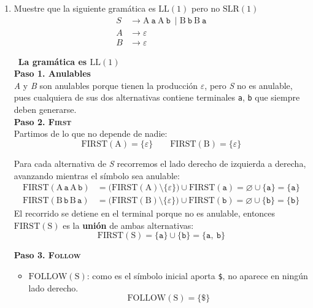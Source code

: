 \documentclass[12pt,letterpaper]{article}
\newcommand{\nt}[1]{\textit{#1}}
\newcommand{\tk}[1]{\texttt{#1}}
\newcommand{\tx}[1]{\text{#1}}
\newcommand{\First}[1]{\mathrm{FIRST}(#1)}
\newcommand{\Follow}[1]{\mathrm{FOLLOW}(#1)}
\renewcommand{\ll}{\mathrm{LL(1)}}
\newcommand{\slr}{\mathrm{SLR(1)}}
\newcommand{\eps}{\varepsilon}
\begin{document}
\thispagestyle{empty}


\newpage

\begin{enumerate}[label=\arabic*.]

\item Muestre que la siguiente gramática es $\ll$ pero no $\slr$
  \[
  \begin{aligned}
    \nt{S} &\to \tx{A}\ \tk{a}\ \tx{A}\ \tk{b}\ \mid \tx{B}\ \tk{b}\ \tx{B}\ \tk{a} \\
    \nt{A} &\to \eps \\
    \nt{B} &\to \eps
  \end{aligned}
  \]

  \bigskip
  
  \ \textbf{\large La gramática es $\ll$}\\

  \textbf{Paso 1. Anulables}\\
  \nt{A} y \nt{B} son anulables porque tienen la producción $\eps$, pero \nt{S} no es anulable, pues
  cualquiera de sus dos alternativas contiene terminales \tk{a}, \tk{b} que siempre deben generarse.\\

  \textbf{Paso 2. \textsc{First}}\\
  Partimos de lo que no depende de nadie:
  \[
  \First{\tx{A}} = \{\eps\} \qquad \First{\tx{B}} = \{\eps\}
  \]

  Para cada alternativa de \nt{S} recorremos el lado derecho de izquierda a derecha, avanzando mientras el
  símbolo sea anulable:
  \[
  \begin{aligned}
    \First{\tx{A}\,\tk{a}\,\tx{A}\,\tk{b}}
    &= \big(\First{\tx{A}}\setminus\{\eps\}\big) \cup \First{\tk{a}}
    = \varnothing \cup \{\tk{a}\} = \{\tk{a}\} \\
    \First{\tx{B}\,\tk{b}\,\tx{B}\,\tk{a}}
    &= \big(\First{\tx{B}}\setminus\{\eps\}\big) \cup \First{\tk{b}}
    = \varnothing \cup \{\tk{b}\} = \{\tk{b}\}
  \end{aligned}
  \]
  El recorrido se detiene en el terminal porque no es anulable, entonces $\First{\tx{S}}$ es la
  \textbf{unión} de ambas alternativas:
  \[
  \First{\tx{S}} = \{\tk{a}\} \cup \{\tk{b}\} = \{\tk{a},\ \tk{b}\}
  \]

  \textbf{Paso 3. \textsc{Follow}}
  \begin{itemize}
  \item $\Follow{\tx{S}}$: como es el símbolo inicial aporta \tk{\$}, no aparece en ningún lado derecho.
    \[
    \Follow{\tx{S}} = \{\tk{\$}\}
    \]


\end{itemize}
\end{enumerate}
\end{document}
